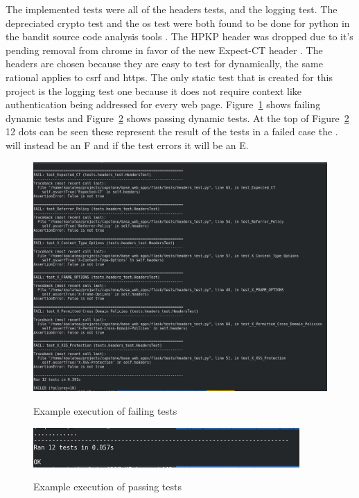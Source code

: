 The implemented tests were all of the headers tests, and the logging test. The depreciated crypto test and the os test were both found to be done for python in the bandit source code analysis tools
\cite{bandit}. The HPKP header was dropped due to it's pending removal from chrome in favor of the new Expect-CT header \cite{hpkp}. The headers are chosen because they are easy to test for
dynamically, the same rational applies to csrf and https. The only static test that is created for this project is the logging test one because it does not require context like authentication being
addressed for every web page. Figure~\ref{fig:fig2} shows failing dynamic tests and Figure~\ref{fig:fig3} shows passing dynamic tests. At the top of Figure~\ref{fig:fig3} 12 dots can be seen these
represent the result of the tests in a failed case the . will instead be an F and if the test errors it will be an E.
\begin{figure}[!ht]
  \centering
\includegraphics[width=5in]{unittestfail}
\caption{\label{fig:fig2}}Example execution of failing tests
\end{figure}
\begin{figure}[!ht]
  \centering
\includegraphics[width=4in]{unittestpass}
\caption{\label{fig:fig3}}Example execution of passing tests
\end{figure}

